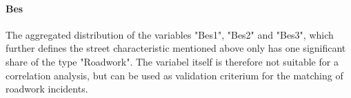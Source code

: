 \documentclass[a4paper,headsepline,footsepline,fontsize=11pt,BCOR=12mm,DIV=12]{report}
\begin{document}


\paragraph{Bes}
The aggregated distribution of the variables "Bes1", "Bes2" and "Bes3", which further defines the street characteristic mentioned above only has one significant share of the type "Roadwork". The variabel itself is therefore not suitable for a correlation analysis, but can be used as validation criterium for the matching of roadwork incidents.
\end{document}
